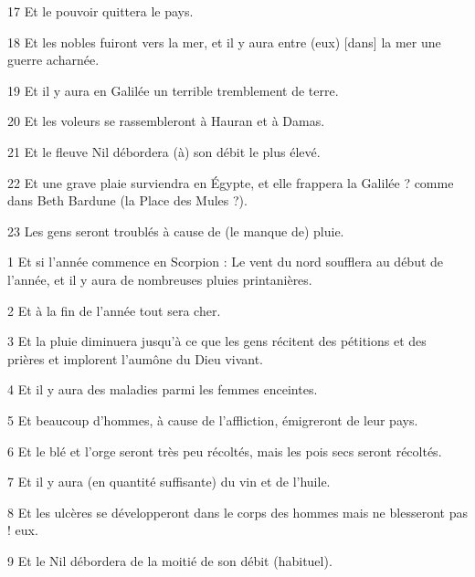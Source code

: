 \par 17 Et le pouvoir quittera le pays.

\par 18 Et les nobles fuiront vers la mer, et il y aura entre (eux) [dans] la mer une guerre acharnée.

\par 19 Et il y aura en Galilée un terrible tremblement de terre.

\par 20 Et les voleurs se rassembleront à Hauran et à Damas.

\par 21 Et le fleuve Nil débordera (à) son débit le plus élevé.

\par 22 Et une grave plaie surviendra en Égypte, et elle frappera la Galilée ? comme dans Beth Bardune (la Place des Mules ?).

\par 23 Les gens seront troublés à cause de (le manque de) pluie.


\par 1 Et si l'année commence en Scorpion : Le vent du nord soufflera au début de l'année, et il y aura de nombreuses pluies printanières.

\par 2 Et à la fin de l'année tout sera cher.

\par 3 Et la pluie diminuera jusqu'à ce que les gens récitent des pétitions et des prières et implorent l'aumône du Dieu vivant.

\par 4 Et il y aura des maladies parmi les femmes enceintes.

\par 5 Et beaucoup d'hommes, à cause de l'affliction, émigreront de leur pays.

\par 6 Et le blé et l'orge seront très peu récoltés, mais les pois secs seront récoltés.

\par 7 Et il y aura (en quantité suffisante) du vin et de l'huile.

\par 8 Et les ulcères se développeront dans le corps des hommes mais ne blesseront pas ! eux.

\par 9 Et le Nil débordera de la moitié de son débit (habituel).

